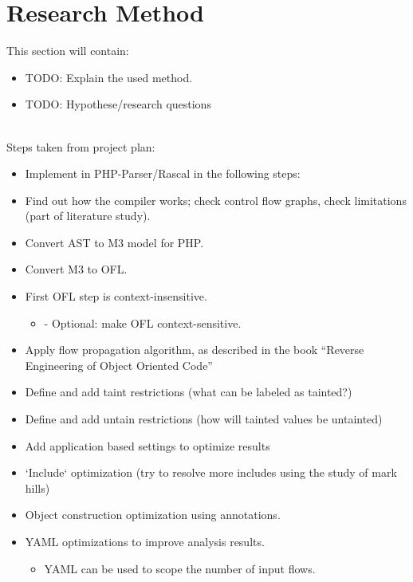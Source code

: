\documentclass[../main.tex]{subfiles}
\begin{document}
    \section{Research Method}\label{sec:research_method}
    This section will contain:
    \begin{itemize}[noitemsep,nolistsep]
        \item TODO: Explain the used method. %
        \item TODO: Hypothese/research questions %
    \end{itemize}
    \\
    Steps taken from project plan:
    \begin{itemize}[noitemsep,nolistsep]
        \item Implement in PHP-Parser/Rascal in the following steps:
        \item Find out how the compiler works; check control flow graphs, check limitations (part of literature study).
        \item Convert AST to M3 model for PHP.
        \item Convert M3 to OFL.
        \item First OFL step is context-insensitive.
        \begin{itemize}[noitemsep,nolistsep]
            \item - Optional: make OFL context-sensitive.
        \end{itemize}
        \item Apply flow propagation algorithm, as described in the book “Reverse Engineering of Object Oriented Code”
        \item Define and add taint restrictions (what can be labeled as tainted?)
        \item Define and add untain restrictions (how will tainted values be untainted)
        \item Add application based settings to optimize results
        \item `Include` optimization (try to resolve more includes using the study of mark hills)
        \item Object construction optimization using annotations.
        \item YAML optimizations to improve analysis results.
        \begin{itemize}[noitemsep,nolistsep]
            \item YAML can be used to scope the number of input flows.
        \end{itemize}

\end{itemize}
\end{document}
